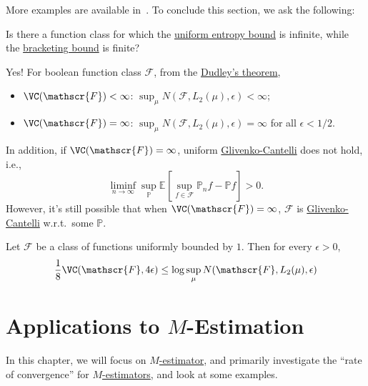 More examples are available in~\cite{vandervaartWeakConvergenceEmpirical1996}. To conclude this section, we ask the following:

\begin{problem}
Is there a function class for which the \hyperref[thm:uniform-entropy-integral-bound]{uniform entropy bound} is infinite, while the \hyperref[thm:bracketing-bound]{bracketing bound} is finite?
\end{problem}
\begin{answer}
	Yes! For boolean function class \(\mathscr{F} \), from the \hyperref[thm:Dudley]{Dudley's theorem},
	\begin{itemize}
		\item \(\VC(\mathscr{F} ) < \infty \): \(\sup _\mu N(\mathscr{F} , L_2(\mu ), \epsilon ) < \infty\);
		\item \(\VC(\mathscr{F} ) = \infty \): \(\sup _\mu N(\mathscr{F} , L_2(\mu ), \epsilon ) = \infty \) for all \(\epsilon < 1 / 2\).
	\end{itemize}
	In addition, if \(\VC(\mathscr{F} ) = \infty \), uniform \hyperref[def:Glivenko-Cantelli]{Glivenko-Cantelli} does not hold, i.e.,
	\[
		\liminf_{n \to \infty} \sup _\mathbb{P} \mathbb{E}_{}\left[\sup _{f\in \mathscr{F} } \mathbb{P} _n f - \mathbb{P} f \right] > 0.
	\]
	However, it's still possible that when \(\VC(\mathscr{F} ) = \infty \), \(\mathscr{F} \) is \hyperref[def:Glivenko-Cantelli]{Glivenko-Cantelli} w.r.t.\ some \(\mathbb{P} \).
\end{answer}


\begin{lemma}
	Let \(\mathscr{F} \) be a class of functions uniformly bounded by \(1\). Then for every \(\epsilon > 0\),
	\[
		\frac{1}{8}\VC(\mathscr{F} , 4\epsilon )
		\leq \log \sup _\mu N(\mathscr{F} , L_2(\mu ), \epsilon )
	\]
\end{lemma}

\chapter{Applications to \(M\)-Estimation}
In this chapter, we will focus on \hyperref[subsec:M-estimators]{\(M\)-estimator}, and primarily investigate the ``rate of convergence'' for \hyperref[subsec:M-estimators]{\(M\)-estimators}, and look at some examples.

